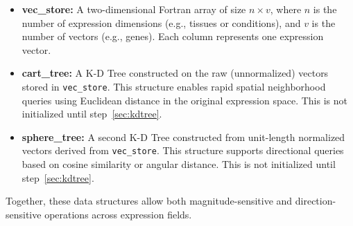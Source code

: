         \begin{itemize}
            \item \textbf{vec\_store:} A two-dimensional Fortran array of size \( n \times v \), where \( n \) is the number of expression dimensions (e.g., tissues or conditions), and \( v \) is the number of vectors (e.g., genes). Each column represents one expression vector.

            \item \textbf{cart\_tree:} A K-D Tree constructed on the raw (unnormalized) vectors stored in \texttt{vec\_store}. This structure enables rapid spatial neighborhood queries using Euclidean distance in the original expression space. This is not initialized until step~\ref{sec:kdtree}.

            \item \textbf{sphere\_tree:} A second K-D Tree constructed from unit-length normalized vectors derived from \texttt{vec\_store}. This structure supports directional queries based on cosine similarity or angular distance. This is not initialized until step~\ref{sec:kdtree}.
        \end{itemize}

        Together, these data structures allow both magnitude-sensitive and direction-sensitive operations across expression fields.